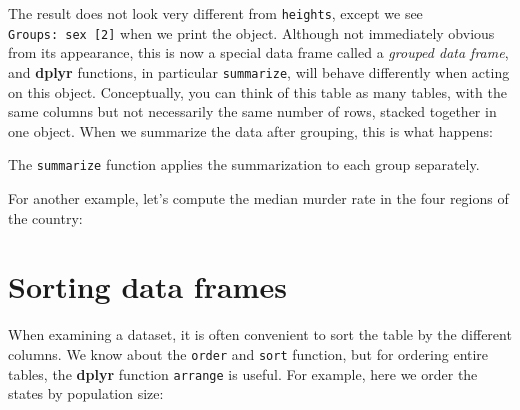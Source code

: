 \documentclass[
]{krantz}
\newenvironment{Shaded}{\begin{snugshade}}{\end{snugshade}}
\newcommand{\CommentTok}[1]{\textcolor[rgb]{0.37,0.37,0.37}{\textit{#1}}}
\newcommand{\DataTypeTok}[1]{\textcolor[rgb]{0.27,0.27,0.27}{#1}}
\newcommand{\KeywordTok}[1]{\textcolor[rgb]{0.27,0.27,0.27}{\textbf{#1}}}
\newcommand{\NormalTok}[1]{#1}
\newcommand{\OperatorTok}[1]{\textcolor[rgb]{0.43,0.43,0.43}{\textbf{#1}}}
\newcommand{\StringTok}[1]{\textcolor[rgb]{0.5,0.5,0.5}{#1}}
\begin{document}
The result does not look very different from \texttt{heights}, except we see \texttt{Groups:\ sex\ {[}2{]}} when we print the object. Although not immediately obvious from its appearance, this is now a special data frame called a \emph{grouped data frame}, and \textbf{dplyr} functions, in particular \texttt{summarize}, will behave differently when acting on this object. Conceptually, you can think of this table as many tables, with the same columns but not necessarily the same number of rows, stacked together in one object. When we summarize the data after grouping, this is what happens:

\begin{Shaded}
\end{Shaded}

The \texttt{summarize} function applies the summarization to each group separately.

For another example, let's compute the median murder rate in the four regions of the country:

\begin{Shaded}
\end{Shaded}

\hypertarget{sorting-data-frames}{%
\section{Sorting data frames}\label{sorting-data-frames}}

When examining a dataset, it is often convenient to sort the table by the different columns. We know about the \texttt{order} and \texttt{sort} function, but for ordering entire tables, the \textbf{dplyr} function \texttt{arrange} is useful. For example, here we order the states by population size:
\end{document}
